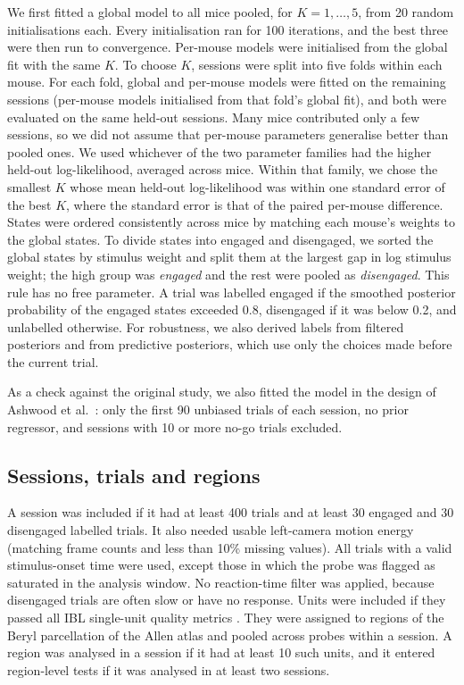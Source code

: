 \documentclass[11pt]{article}
\begin{document}
We first fitted a global model to all mice pooled, for $K = 1,\dots,5$, from 20 random initialisations each. Every initialisation ran for 100 iterations, and the best three were then run to convergence. Per-mouse models were initialised from the global fit with the same $K$. To choose $K$, sessions were split into five folds within each mouse. For each fold, global and per-mouse models were fitted on the remaining sessions (per-mouse models initialised from that fold's global fit), and both were evaluated on the same held-out sessions. Many mice contributed only a few sessions, so we did not assume that per-mouse parameters generalise better than pooled ones. We used whichever of the two parameter families had the higher held-out log-likelihood, averaged across mice. Within that family, we chose the smallest $K$ whose mean held-out log-likelihood was within one standard error of the best $K$, where the standard error is that of the paired per-mouse difference. States were ordered consistently across mice by matching each mouse's weights to the global states. To divide states into engaged and disengaged, we sorted the global states by stimulus weight and split them at the largest gap in log stimulus weight; the high group was \emph{engaged} and the rest were pooled as \emph{disengaged}. This rule has no free parameter. A trial was labelled engaged if the smoothed posterior probability of the engaged states exceeded 0.8, disengaged if it was below 0.2, and unlabelled otherwise. For robustness, we also derived labels from filtered posteriors and from predictive posteriors, which use only the choices made before the current trial.

As a check against the original study, we also fitted the model in the design of Ashwood et al.\ \citep{ashwood2022}: only the first 90 unbiased trials of each session, no prior regressor, and sessions with 10 or more no-go trials excluded.

\subsection{Sessions, trials and regions}
A session was included if it had at least 400 trials and at least 30 engaged and 30 disengaged labelled trials. It also needed usable left-camera motion energy (matching frame counts and less than 10\% missing values). All trials with a valid stimulus-onset time were used, except those in which the probe was flagged as saturated in the analysis window. No reaction-time filter was applied, because disengaged trials are often slow or have no response. Units were included if they passed all IBL single-unit quality metrics \citep{ibl2025bwm}. They were assigned to regions of the Beryl parcellation of the Allen atlas and pooled across probes within a session. A region was analysed in a session if it had at least 10 such units, and it entered region-level tests if it was analysed in at least two sessions.
\end{document}
